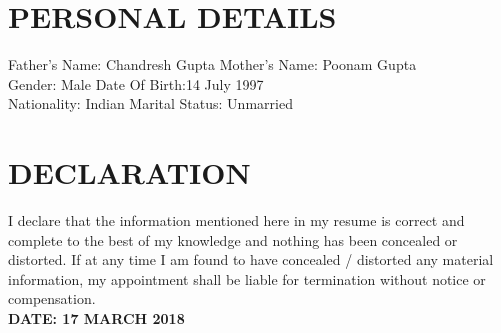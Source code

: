 \documentclass[11pt]{article} %
\newcommand{\NewPart}[1]{\section*{\uppercase{#1}}}
\begin{document}
\NewPart{ Personal Details}{}
Father's Name: Chandresh Gupta 	\hspace{3cm}		Mother's Name: Poonam Gupta \\
Gender: Male 				\hspace{6.35cm}		Date Of Birth:14 July 1997 \\
Nationality: Indian			\hspace{5.40cm}		Marital Status: Unmarried

\NewPart{ Declaration}{}
I declare that the information mentioned here in my resume is correct and complete to the best of my knowledge and nothing has been concealed or distorted. 
If at any time I am found to have concealed / distorted any material information, my appointment shall be liable for termination without notice or compensation. \\


\textbf{DATE: 17 MARCH 2018}
\end{document}
